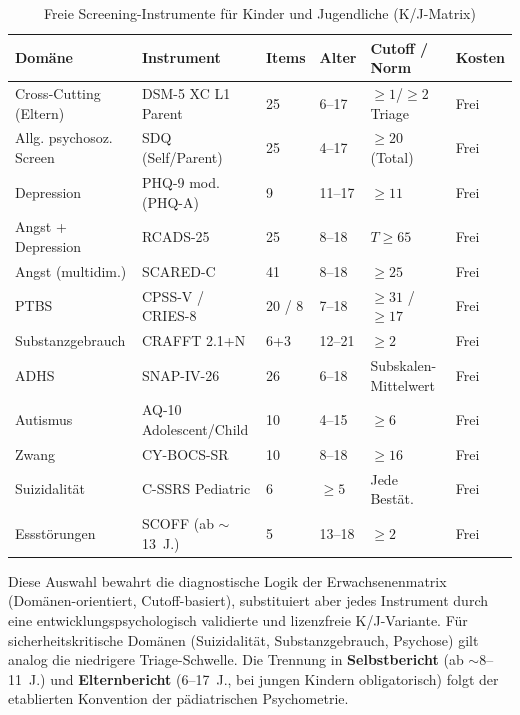 \documentclass[11pt,a4paper]{article}
\newenvironment{CompactLongTable}{%
  \begingroup
  \footnotesize
  \setstretch{1.0}%
  \setlength{\LTpre}{0pt}%
  \setlength{\LTpost}{0pt}%
}{%
  \endgroup
}
\begin{document}
\begin{table}[htbp]
\centering
\caption{Freie Screening-Instrumente f\"ur Kinder und Jugendliche (K/J-Matrix)}
\label{tab:instrumente_kj}
\begin{CompactLongTable}
\begin{tabular}{@{}L{2.4cm}L{2.4cm}L{0.9cm}L{1.5cm}L{2.0cm}L{1.5cm}@{}}
\toprule
\textbf{Dom\"ane} & \textbf{Instrument} & \textbf{Items} & \textbf{Alter} & \textbf{Cutoff / Norm} & \textbf{Kosten} \\
\midrule
Cross-Cutting (Eltern) & DSM-5 XC L1 Parent & 25 & 6--17 & $\geq 1$/$\geq 2$ Triage & Frei \\
\addlinespace
Allg. psychosoz. Screen & SDQ (Self/Parent) & 25 & 4--17 & $\geq 20$ (Total) & Frei \\
\addlinespace
Depression & PHQ-9 mod. (PHQ-A) & 9 & 11--17 & $\geq 11$ & Frei \\
\addlinespace
Angst + Depression & RCADS-25 & 25 & 8--18 & $T \geq 65$ & Frei \\
\addlinespace
Angst (multidim.) & SCARED-C & 41 & 8--18 & $\geq 25$ & Frei \\
\addlinespace
PTBS & CPSS-V / CRIES-8 & 20 / 8 & 7--18 & $\geq 31$ / $\geq 17$ & Frei \\
\addlinespace
Substanzgebrauch & CRAFFT 2.1+N & 6+3 & 12--21 & $\geq 2$ & Frei \\
\addlinespace
ADHS & SNAP-IV-26 & 26 & 6--18 & Subskalen-Mittelwert & Frei \\
\addlinespace
Autismus & AQ-10 Adolescent/Child & 10 & 4--15 & $\geq 6$ & Frei \\
\addlinespace
Zwang & CY-BOCS-SR & 10 & 8--18 & $\geq 16$ & Frei \\
\addlinespace
Suizidalit\"at & C-SSRS Pediatric & 6 & $\geq 5$ & Jede Best\"at. & Frei \\
\addlinespace
Essst\"orungen & SCOFF (ab $\sim$13~J.) & 5 & 13--18 & $\geq 2$ & Frei \\
\bottomrule
\end{tabular}
\end{CompactLongTable}
\end{table}

Diese Auswahl bewahrt die diagnostische Logik der Erwachsenenmatrix (Dom\"anen-orientiert, Cutoff-basiert), substituiert aber jedes Instrument durch eine entwicklungspsychologisch validierte und lizenzfreie K/J-Variante. F\"ur sicherheitskritische Dom\"anen (Suizidalit\"at, Substanzgebrauch, Psychose) gilt analog die niedrigere Triage-Schwelle. Die Trennung in \textbf{Selbstbericht} (ab $\sim$8--11~J.) und \textbf{Elternbericht} (6--17~J., bei jungen Kindern obligatorisch) folgt der etablierten Konvention der p\"adiatrischen Psychometrie.
\end{document}
